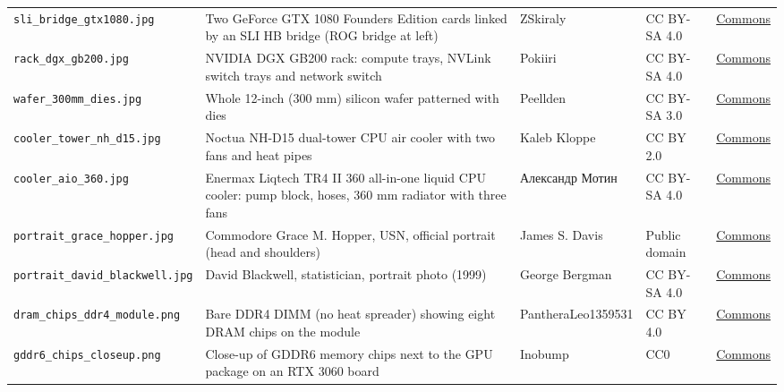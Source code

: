 {\begin{longtable}{@{}>{\raggedright\arraybackslash}p{36mm}>{\raggedright\arraybackslash}p{56mm}>{\raggedright\arraybackslash}p{26mm}>{\raggedright\arraybackslash}p{15mm}l@{}}
\texttt{sli\_\allowbreak{}bridge\_\allowbreak{}gtx1080.jpg} &Two GeForce GTX 1080 Founders Edition cards linked by an SLI HB bridge (ROG bridge at left) & ZSkiraly & CC BY-SA 4.0 & \href{https://commons.wikimedia.org/wiki/File:K\%C3\%A9t_Nvidia_GTX_1080_SLI-ban.jpg}{Commons} \\
\texttt{rack\_\allowbreak{}dgx\_\allowbreak{}gb200.jpg} &NVIDIA DGX GB200 rack: compute trays, NVLink switch trays and network switch & Pokiiri & CC BY-SA 4.0 & \href{https://commons.wikimedia.org/wiki/File:Nvidia_DGX_GB200.jpg}{Commons} \\
\texttt{wafer\_\allowbreak{}300mm\_\allowbreak{}dies.jpg} &Whole 12-inch (300 mm) silicon wafer patterned with dies & Peellden & CC BY-SA 3.0 & \href{https://commons.wikimedia.org/wiki/File:12-inch_silicon_wafer.jpg}{Commons} \\
\texttt{cooler\_\allowbreak{}tower\_\allowbreak{}nh\_\allowbreak{}d15.jpg} &Noctua NH-D15 dual-tower CPU air cooler with two fans and heat pipes & Kaleb Kloppe & CC BY 2.0 & \href{https://commons.wikimedia.org/wiki/File:NH-D15_with_classic_fans.jpg}{Commons} \\
\texttt{cooler\_\allowbreak{}aio\_\allowbreak{}360.jpg} &Enermax Liqtech TR4 II 360 all-in-one liquid CPU cooler: pump block, hoses, 360 mm radiator with three fans & Александр Мотин & CC BY-SA 4.0 & \href{https://commons.wikimedia.org/wiki/File:Enermax_Liqtech_TR4_II_360.jpg}{Commons} \\
\texttt{portrait\_\allowbreak{}grace\_\allowbreak{}hopper.jpg} &Commodore Grace M. Hopper, USN, official portrait (head and shoulders) & James S. Davis & Public domain & \href{https://commons.wikimedia.org/wiki/File:Commodore_Grace_M._Hopper,_USN_(covered)_head_and_shoulders_crop.jpg}{Commons} \\
\texttt{portrait\_\allowbreak{}david\_\allowbreak{}blackwell.jpg} &David Blackwell, statistician, portrait photo (1999) & George Bergman & CC BY-SA 4.0 & \href{https://commons.wikimedia.org/wiki/File:David_Blackwell_1999_(re-scanned,_cropped).jpg}{Commons} \\
\texttt{dram\_\allowbreak{}chips\_\allowbreak{}ddr4\_\allowbreak{}module.png} &Bare DDR4 DIMM (no heat spreader) showing eight DRAM chips on the module & PantheraLeo1359531 & CC BY 4.0 & \href{https://commons.wikimedia.org/wiki/File:16_GiB-DDR4-RAM-Riegel_RAM019FIX_Small_Crop_90_PCNT.png}{Commons} \\
\texttt{gddr6\_\allowbreak{}chips\_\allowbreak{}closeup.png} &Close-up of GDDR6 memory chips next to the GPU package on an RTX 3060 board & Inobump & CC0 & \href{https://commons.wikimedia.org/wiki/File:RTX_3060_12GB_GDDR6_with_GA104.png}{Commons} \\
\end{longtable}}
